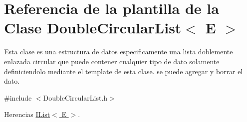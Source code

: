 \hypertarget{classDoubleCircularList}{\section{Referencia de la plantilla de la Clase Double\-Circular\-List$<$ E $>$}
\label{classDoubleCircularList}
}


Esta clase es una estructura de datos especificamente una lista doblemente enlazada circular que puede contener cualquier tipo de dato solamente definiciendolo mediante el template de esta clase. se puede agregar y borrar el dato.  




{\ttfamily \#include $<$Double\-Circular\-List.\-h$>$}



Herencias \hyperlink{classIList}{I\-List$<$ E $>$}.

